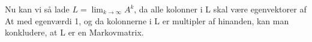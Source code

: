 Nu kan vi så lade $L = \lim_{k \rightarrow \infty} A^k$, da alle kolonner i L skal være egenvektorer af At med egenværdi 1, og da kolonnerne i L er multipler af hinanden, kan man konkludere, at L er en Markovmatrix.









